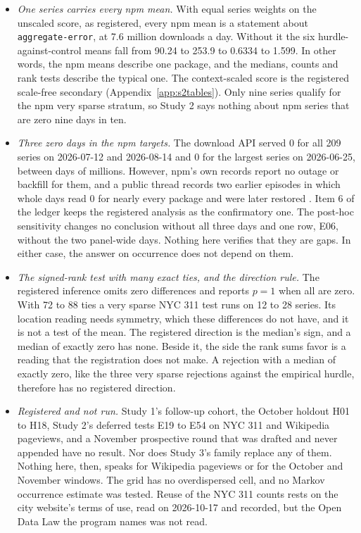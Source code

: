 \begin{itemize}
  into a count law. A model whose output is a mixture, a sample path or Chronos-2's own 21 quantile levels
  would not meet the floor of Section~\ref{sec:design} in the same place. For such a model the very sparse
  question may well be answerable.
\item \emph{One series carries every npm mean.} With equal series weights on the unscaled score, as
  registered, every npm mean is a statement about \texttt{aggregate-error}, at 7.6 million downloads a day.
  Without it the six hurdle-against-control means fall from 90.24 to 253.9 to 0.6334 to 1.599. In other words,
  the npm means describe one package, and the medians, counts and rank tests describe the typical one. The
  context-scaled score is the registered scale-free secondary (Appendix~\ref{app:s2tables}). Only nine series
  qualify for the npm very sparse stratum, so Study 2 says nothing about npm series that are zero nine days in
  ten.
\item \emph{Three zero days in the npm targets.} The download API served 0 for all 209 series on 2026-07-12
  and 2026-08-14 and 0 for the largest series on 2026-06-25, between days of millions. However, npm's own
  records report no outage or backfill for them, and a public thread records two earlier episodes in which
  whole days read 0 for nearly every package and were later restored \citep{npm-community-150808}. Item 6 of
  the ledger keeps the registered analysis as the confirmatory one. The post-hoc sensitivity changes no
  conclusion without all three days and one row, E06, without the two panel-wide days. Nothing here verifies
  that they are gaps. In either case, the answer on occurrence does not depend on them.
\item \emph{The signed-rank test with many exact ties, and the direction rule.} The registered inference omits
  zero differences and reports $p = 1$ when all are zero. With 72 to 88 ties a very sparse NYC 311 test runs
  on 12 to 28 series. Its location reading needs symmetry, which these differences do not have, and it is not
  a test of the mean. The registered direction is the median's sign, and a median of exactly zero has none.
  Beside it, the side the rank sums favor is a reading that the registration does not make. A rejection with a
  median of exactly zero, like the three very sparse rejections against the empirical hurdle, therefore has no
  registered direction.
\item \emph{Registered and not run.} Study 1's follow-up cohort, the October holdout H01 to H18, Study 2's
  deferred tests E19 to E54 on NYC 311 and Wikipedia pageviews, and a November prospective round that was
  drafted and never appended have no result. Nor does Study 3's family replace any of them. Nothing here,
  then, speaks for Wikipedia pageviews or for the October and November windows. The grid has no overdispersed
  cell, and no Markov occurrence estimate was tested. Reuse of the NYC 311 counts rests on the city website's
  terms of use, read on 2026-10-17 and recorded, but the Open Data Law the program names was not read.
\end{itemize}
